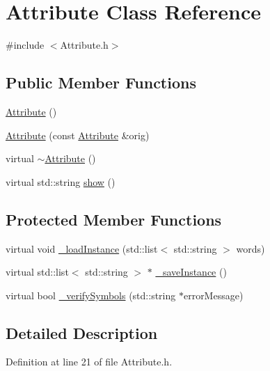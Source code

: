 \hypertarget{class_attribute}{\section{Attribute Class Reference}
\label{class_attribute}
}


{\ttfamily \#include $<$Attribute.\-h$>$}

\subsection*{Public Member Functions}
\begin{DoxyCompactItemize}
\item 
\hyperlink{class_attribute_a8ba4e5a507aef352563e1e56f1930e66}{Attribute} ()
\item 
\hyperlink{class_attribute_a8a0c53bda9cc94180f06bda254809261}{Attribute} (const \hyperlink{class_attribute}{Attribute} \&orig)
\item 
virtual \hyperlink{class_attribute_a28ab087bb886728670e4ae5791bc2ea8}{$\sim$\-Attribute} ()
\item 
virtual std\-::string \hyperlink{class_attribute_aa29f79466bd6ed5e36c402ec57cb2050}{show} ()
\end{DoxyCompactItemize}
\subsection*{Protected Member Functions}
\begin{DoxyCompactItemize}
\item 
virtual void \hyperlink{class_attribute_ac76d3302ec24a4cca1e84fed221cf917}{\-\_\-load\-Instance} (std\-::list$<$ std\-::string $>$ words)
\item 
virtual std\-::list$<$ std\-::string $>$ $\ast$ \hyperlink{class_attribute_a32bd3d820fa2957d4a5d8c98db5b50e0}{\-\_\-save\-Instance} ()
\item 
virtual bool \hyperlink{class_attribute_adbe1f438203db4e87b0c8e1cd5e0182d}{\-\_\-verify\-Symbols} (std\-::string $\ast$error\-Message)
\end{DoxyCompactItemize}


\subsection{Detailed Description}


Definition at line 21 of file Attribute.\-h.



